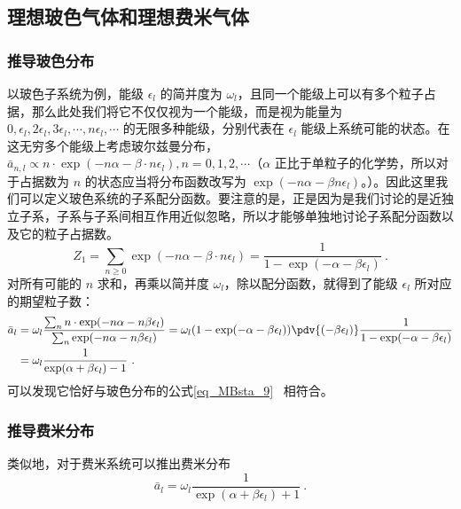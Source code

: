\subsection{理想玻色气体和理想费米气体}
\subsubsection{推导玻色分布}
以玻色子系统为例，能级 $\epsilon_l$ 的简并度为 $\omega_l$，且同一个能级上可以有多个粒子占据，那么此处我们将它不仅仅视为一个能级，而是视为能量为 $0,\epsilon_l,2\epsilon_l,3\epsilon_l,\cdots, n\epsilon_l,\cdots$ 的无限多种能级，分别代表在 $\epsilon_l$ 能级上系统可能的状态。在这无穷多个能级上考虑玻尔兹曼分布，$\bar{a}_{n,l} \propto n\cdot \exp(-n\alpha-\beta\cdot n\epsilon_l),n=0,1,2,\cdots $（$\alpha$ 正比于单粒子的化学势，所以对于占据数为 $n$ 的状态应当将分布函数改写为 $\exp(-n\alpha-\beta n\epsilon_l)$。）。因此这里我们可以定义玻色系统的子系配分函数。要注意的是，正是因为是我们讨论的是近独立子系，子系与子系间相互作用近似忽略，所以才能够单独地讨论子系配分函数以及它的粒子占据数。
\begin{equation}
Z_1=\sum_{n\ge 0} \exp(-n\alpha-\beta\cdot n\epsilon_l)=\frac{1}{1-\exp(-\alpha-\beta\epsilon_l)}~.
\end{equation}
对所有可能的 $n$ 求和，再乘以简并度 $\omega_l$，除以配分函数，就得到了能级 $\epsilon_l$ 所对应的期望粒子数：
\begin{equation}\label{eq_depsys_1}
\begin{aligned}
\bar a_l&=\omega_l \frac{\sum_n n\cdot \exp(-n\alpha-n\beta\epsilon_l)}{\sum_n \exp(-n\alpha-n\beta\epsilon_l)}=\omega_l (1-\exp(-\alpha-\beta\epsilon_l)) \pdv{(-\beta\epsilon_l)} \frac{1}{1-\exp(-\alpha-\beta\epsilon_l)}\\
&=\omega_l \frac{1}{\exp(\alpha+\beta\epsilon_l)-1}~.
\end{aligned}
\end{equation}
可以发现它恰好与玻色分布的公式\autoref{eq_MBsta_9}~ 相符合。
\subsubsection{推导费米分布}
类似地，对于费米系统可以推出费米分布
\begin{equation}
\bar a_l=\omega_l \frac{1}{\exp(\alpha+\beta\epsilon_l)+1}~.
\end{equation}
